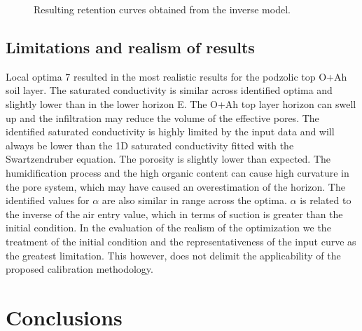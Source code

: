 \documentclass[review,times,3p,twocolumn,10pt]{elsarticle}
\begin{document}
\begin{figure}
\centering
{}
\caption{Resulting retention curves obtained from the inverse model.}
\label{retc-final}
\end{figure}


\subsection{Limitations and realism of results}


Local optima 7 resulted in the most realistic results for the podzolic top O+Ah soil layer. The saturated conductivity is similar across identified optima and slightly lower than in the lower horizon E. The O+Ah top layer horizon can swell up and the infiltration may reduce the volume of the effective pores. The identified saturated conductivity is highly limited by the input data and will always be lower than the 1D saturated conductivity fitted with the Swartzendruber equation. The porosity is slightly lower than expected. The humidification process and the high organic content can cause high curvature in the pore system, which may have caused an overestimation of the horizon.  The identified values for $\alpha$ are also similar in range across the optima. $\alpha$ is related to the inverse of the air entry value, which in terms of suction is greater than the initial condition. 
In the evaluation of the realism of the optimization we the treatment of the initial condition and the representativeness of the input curve as the greatest limitation. This however, does not delimit the applicability of the proposed calibration methodology. 

 

\section{Conclusions}
\end{document}
